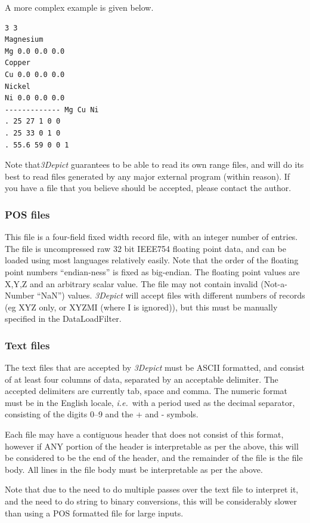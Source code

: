 \documentclass[10pt]{article}
\begin{document}
A more complex example is given below.

\begin{verbatim}
3 3
Magnesium
Mg 0.0 0.0 0.0
Copper
Cu 0.0 0.0 0.0
Nickel
Ni 0.0 0.0 0.0
------------- Mg Cu Ni
. 25 27 1 0 0
. 25 33 0 1 0
. 55.6 59 0 0 1
\end{verbatim}

Note that\emph{3Depict} guarantees to be able to read its own range files, and will do its best to read files generated by any major external program (within reason). If you have a file that you believe should be accepted, please contact the author.

\subsubsection{POS files}
\label{sec:posformat}
This file is a four-field fixed width record file, with an integer number of entries. The file is uncompressed raw 32 bit IEEE754 floating point data, and can be loaded using most languages relatively easily. Note that the order of the floating point numbers ``endian-ness'' is fixed as big-endian. The floating point values are X,Y,Z and an arbitrary scalar value. The file may not contain invalid (Not-a-Number ``NaN'') values. \emph{3Depict} will accept files with different numbers of records (eg XYZ only, or XYZMI (where I is ignored)), but this must be manually specified in the DataLoadFilter.

\subsubsection{Text files}
\label{sec:textformat}
The text files that are accepted by \emph{3Depict} must be ASCII formatted, and consist of at least four columns of data, separated by an acceptable delimiter. The accepted delimiters are currently tab, space and comma. The numeric format must be in the English locale, \emph{i.e.}\ with a period used as the decimal separator, consisting of the digits 0--9 and the + and - symbols.

Each file may have a contiguous header that does not consist of this format, however if ANY portion of the header is interpretable as per the above, this will be considered to be the end of the header, and the remainder of the file is the file body. All lines in the file body must be interpretable as per the above.  

Note that due to the need to do multiple passes over the text file to interpret it, and the need to do string to binary conversions, this will be considerably slower than using a POS formatted file for large inputs.
\end{document}
